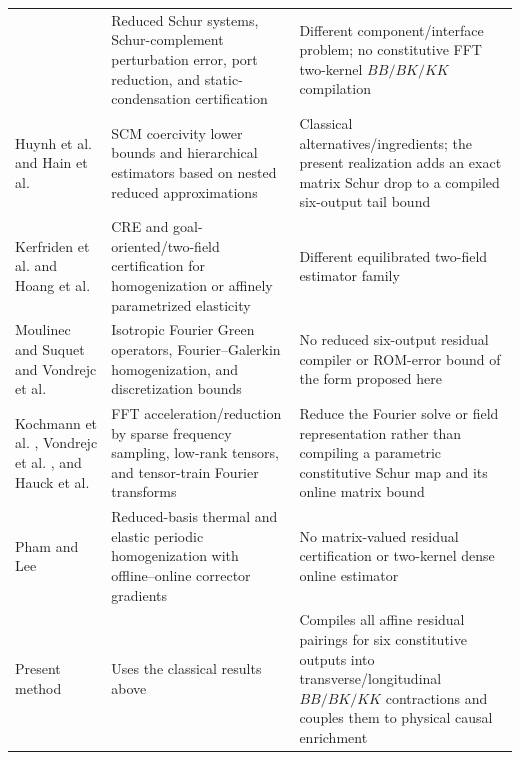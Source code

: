 \begin{table}
\begin{tabularx}{\textwidth}{p{}p{}X}
& Reduced Schur systems, Schur-complement perturbation error, port reduction, and static-condensation certification
& Different component/interface problem; no constitutive FFT two-kernel \(BB/BK/KK\) compilation \\
Huynh et al. \cite{huynh2007scm} and Hain et al. \cite{hain2019hierarchical}
& SCM coercivity lower bounds and hierarchical estimators based on nested reduced approximations
& Classical alternatives/ingredients; the present realization adds an exact matrix Schur drop to a compiled six-output tail bound \\
Kerfriden et al. \cite{kerfriden2014cre} and Hoang et al. \cite{hoang2016twofield}
& CRE and goal-oriented/two-field certification for homogenization or affinely parametrized elasticity
& Different equilibrated two-field estimator family \\
Moulinec and Suquet \cite{moulinec1998numerical} and Vondrejc et al. \cite{vondrejc2014fft,vondrejc2015bounds}
& Isotropic Fourier Green operators, Fourier--Galerkin homogenization, and discretization bounds
& No reduced six-output residual compiler or ROM-error bound of the form proposed here \\
Kochmann et al. \cite{kochmann2019sparsefft}, Vondrejc et al.
\cite{vondrejc2020lowrank}, and Hauck et al. \cite{hauck2026sfft}
& FFT acceleration/reduction by sparse frequency sampling, low-rank tensors,
and tensor-train Fourier transforms
& Reduce the Fourier solve or field representation rather than compiling a
parametric constitutive Schur map and its online matrix bound \\
Pham and Lee \cite{pham2024rbhm}
& Reduced-basis thermal and elastic periodic homogenization with offline--online corrector gradients
& No matrix-valued residual certification or two-kernel dense online estimator \\
Present method
& Uses the classical results above
& Compiles all affine residual pairings for six constitutive outputs into transverse/longitudinal \(BB/BK/KK\) contractions and couples them to physical causal enrichment \\
\bottomrule
\end{tabularx}
\end{table}
